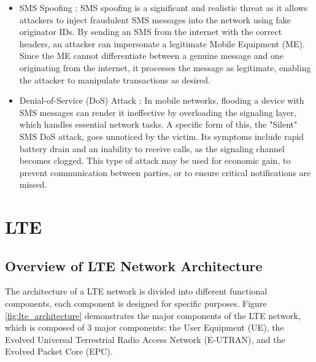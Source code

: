 \documentclass[conference]{IEEEtran}
\begin{document}
\begin{itemize}
\begin{itemize}
    \item SMS Spoofing : SMS spoofing is a significant and realistic threat as it allows attackers to inject fraudulent SMS messages into the network using fake originator IDs.
    By sending an SMS from the internet with the correct headers, an attacker can impersonate a legitimate Mobile Equipment (ME). Since the ME cannot differentiate between a genuine message and one originating from the internet, it processes the message as legitimate, enabling the attacker to manipulate transactions as desired.

    \item Denial-of-Service (DoS) Attack : In mobile networks, flooding a device with SMS messages can render it ineffective by overloading the signaling layer, which handles essential network tasks. 
    A specific form of this, the "Silent" SMS DoS attack, goes unnoticed by the victim. Its symptoms include rapid battery drain and an inability to receive calls, as the signaling channel becomes clogged. 
    This type of attack may be used for economic gain, to prevent communication between parties, or to ensure critical notifications are missed.
 
\end{itemize}
    
\end{itemize}



\section{LTE}
\subsection{Overview of LTE Network Architecture}
The architecture of a LTE network is divided into different functional components, each component is designed for specific purposes. Figure \ref{fig:lte_architecture} demonstrates the major components of the LTE network, which is composed of 3 major components: the User Equipment (UE), the Evolved Universal Terrestrial Radio Access Network (E-UTRAN), and the Evolved Packet Core (EPC).

    
\end{document}
